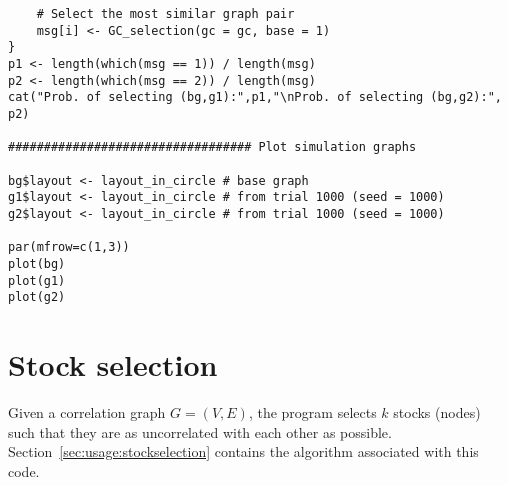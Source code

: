 {\begin{lstlisting}
	# Select the most similar graph pair
	msg[i] <- GC_selection(gc = gc, base = 1)
}
p1 <- length(which(msg == 1)) / length(msg)
p2 <- length(which(msg == 2)) / length(msg)
cat("Prob. of selecting (bg,g1):",p1,"\nProb. of selecting (bg,g2):", p2)

################################## Plot simulation graphs

bg$layout <- layout_in_circle # base graph
g1$layout <- layout_in_circle # from trial 1000 (seed = 1000)
g2$layout <- layout_in_circle # from trial 1000 (seed = 1000)

par(mfrow=c(1,3))
plot(bg)
plot(g1)
plot(g2)
\end{lstlisting}
}




















\section{Stock selection}
\label{sec:appendicies:usage:stockselection}

Given a correlation graph $G=(V,E)$, the program selects $k$ stocks (nodes) 
such that they are as uncorrelated with each other as possible. 
Section~\ref{sec:usage:stockselection} contains the algorithm associated with 
this code.

